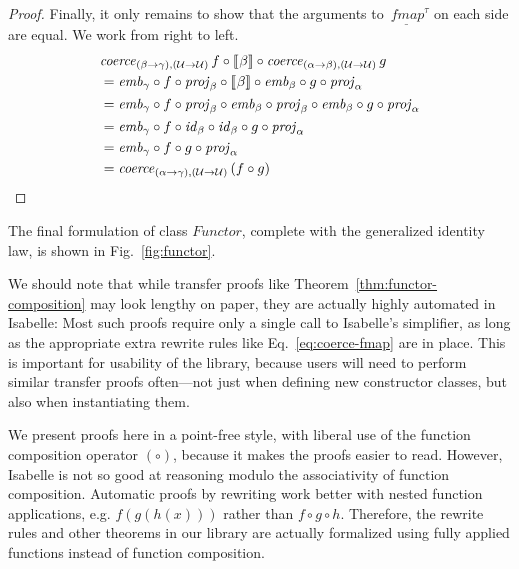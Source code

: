 \documentclass{sigplanconf}
\newcommand{\U}{\ensuremath{\mathcal{U}}}
\newcommand{\univ}[1]{\ensuremath{\underline{#1}}}
\newcommand{\REP}[1]{\ensuremath{\llbracket#1\rrbracket}}
\newcommand{\hair}{\mskip1mu}
\newcommand{\hsc}[1]{\ensuremath{\mathit{#1}}}
\newcommand{\hsid}{\hsc{id}}
\newcommand{\hsemb}{\hsc{emb}}
\newcommand{\hsprj}{\hsc{proj}}
\newcommand{\hscoerce}{\hsc{coerce}}
\newcommand{\fmap}{\,\hsc{fmap}} %
\newcommand{\fmapU}{\univ{\fmap}}
\newcommand{\tA}{\alpha}
\newcommand{\tB}{\beta}
\newcommand{\tC}{\gamma}
\newcommand{\tT}{\tau}
\theoremstyle{definition}
\begin{document}
\begin{proof}
Finally, it only remains to show that the arguments to $\fmapU^\tT$ on each side are equal. We work from right to left.
\begin{align*}
& \hscoerce_{(\tB\to\tC),(\U\to\U)}\,f \circ \REP{\hair\tB} \circ \hscoerce_{(\tA\to\tB),(\U\to\U)}\,g \\
& = \hsemb_\tC \circ f \circ \hsprj_\tB \circ \REP{\hair\tB} \circ \hsemb_\tB \circ g \circ \hsprj_\tA \\
& = \hsemb_\tC \circ f \circ \hsprj_\tB \circ \hsemb_\tB \circ \hsprj_\tB \circ \hsemb_\tB \circ g \circ \hsprj_\tA \\
& = \hsemb_\tC \circ f \circ \hsid_\tB \circ \hsid_\tB \circ g \circ \hsprj_\tA \\
& = \hsemb_\tC \circ f \circ g \circ \hsprj_\tA \\
& = \hscoerce_{(\tA\to\tC),(\U\to\U)}\,(f \circ g) \qedhere
\end{align*}
\end{proof}

The final formulation of class \hsc{Functor}, complete with the generalized identity law, is shown in Fig.~\ref{fig:functor}.

We should note that while transfer proofs like Theorem~\ref{thm:functor-composition} may look lengthy on paper, they are actually highly automated in Isabelle: Most such proofs require only a single call to Isabelle's simplifier, as long as the appropriate extra rewrite rules like Eq.~\eqref{eq:coerce-fmap} are in place. This is important for usability of the library, because users will need to perform similar transfer proofs often---not just when defining new constructor classes, but also when instantiating them.

We present proofs here in a point-free style, with liberal use of the function composition operator $(\circ)$, because it makes the proofs easier to read. However, Isabelle is not so good at reasoning modulo the associativity of function composition. Automatic proofs by rewriting work better with nested function applications, e.g. $f(g(h(x)))$ rather than $f \circ g \circ h$. Therefore, the rewrite rules and other theorems in our library are actually formalized using fully applied functions instead of function composition.
\end{document}
